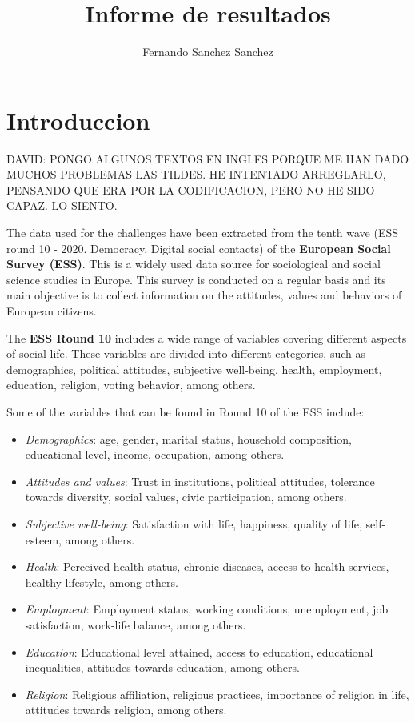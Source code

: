 \documentclass{article}
\title{Informe de resultados}
\author{Fernando Sanchez Sanchez}
\begin{document}

\maketitle

\section{Introduccion}

DAVID: PONGO ALGUNOS TEXTOS EN INGLES PORQUE ME HAN DADO MUCHOS PROBLEMAS LAS TILDES. HE INTENTADO ARREGLARLO, PENSANDO QUE ERA POR LA CODIFICACION, PERO NO HE SIDO CAPAZ. LO SIENTO.


The data used for the challenges have been extracted from the tenth wave (ESS round 10 - 2020. Democracy, Digital social contacts) of the \textbf{European Social Survey (ESS)}. This is a widely used data source for sociological and social science studies in Europe. This survey is conducted on a regular basis and its main objective is to collect information on the attitudes, values and behaviors of European citizens.

The \textbf{ESS Round 10} includes a wide range of variables covering different aspects of social life. These variables are divided into different categories, such as demographics, political attitudes, subjective well-being, health, employment, education, religion, voting behavior, among others.

Some of the variables that can be found in Round 10 of the ESS include:

\begin{itemize}
\item \textit{Demographics}: age, gender, marital status, household composition, educational level, income, occupation, among others.
\item \textit{Attitudes and values}: Trust in institutions, political attitudes, tolerance towards diversity, social values, civic participation, among others.
\item \textit{Subjective well-being}: Satisfaction with life, happiness, quality of life, self-esteem, among others.
\item \textit{Health}: Perceived health status, chronic diseases, access to health services, healthy lifestyle, among others.
\item \textit{Employment}: Employment status, working conditions, unemployment, job satisfaction, work-life balance, among others.
\item \textit{Education}: Educational level attained, access to education, educational inequalities, attitudes towards education, among others.
\item \textit{Religion}: Religious affiliation, religious practices, importance of religion in life, attitudes towards religion, among others.
\end{itemize}
\end{document}
